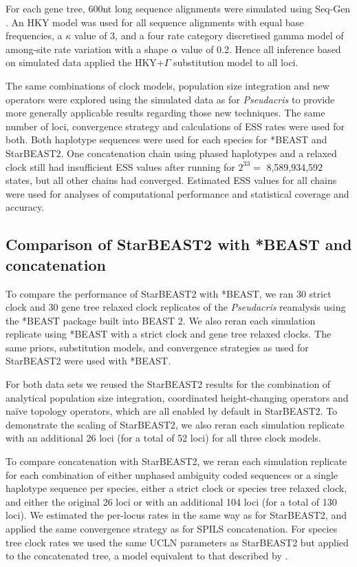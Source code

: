 \documentclass[12pt]{article}
\begin{document}
For each gene tree, 600nt long sequence alignments were simulated using Seq-Gen \citep{Rambaut01061997}. An HKY model was used for all sequence alignments
with equal base frequencies, a $\kappa$ value of 3, and a four rate category
discretised gamma model of among-site rate variation with a shape $\alpha$
value of 0.2. Hence all inference based on simulated data applied the HKY+$\Gamma$
substitution model to all loci.

The same combinations of clock models, population size integration and new
operators were explored using the simulated data as for \textit{Pseudacris} to
provide more generally applicable results regarding those new techniques. The
same number of loci, convergence strategy and calculations of ESS rates were
used for both. Both haplotype sequences were used for each species for *BEAST
and StarBEAST2. One concatenation chain using phased haplotypes and a relaxed
clock still had insufficient ESS values after running for $2^{33} =$
8,589,934,592 states, but all other chains had converged. Estimated ESS
values for all chains were used for analyses of computational performance and
statistical coverage and accuracy.

\subsection{Comparison of StarBEAST2 with *BEAST and concatenation}

To compare the performance of StarBEAST2 with *BEAST, we ran 30 strict clock
and 30 gene tree relaxed clock replicates of the \textit{Pseudacris}
reanalysis using the *BEAST package built into BEAST 2. We also reran each
simulation replicate using *BEAST with a strict clock and gene tree relaxed
clocks. The same priors, substitution models, and convergence strategies as
used for StarBEAST2 were used with *BEAST.

For both data sets we reused the StarBEAST2 results for the combination of
analytical population size integration, coordinated height-changing operators
and na\"ive topology operators, which are all enabled by default in
StarBEAST2. To demonstrate the scaling of StarBEAST2, we also reran each
simulation replicate with an additional 26 loci (for a total of 52 loci) for
all three clock models.

To compare concatenation with StarBEAST2, we reran each simulation replicate
for each combination of either unphased ambiguity coded sequences or a single
haplotype sequence per species, either a strict clock or species tree relaxed
clock, and either the original 26 loci or with an additional 104 loci (for a
total of 130 loci). We estimated the per-locus rates in the same way as for
StarBEAST2, and applied the same convergence strategy as for SPILS
concatenation. For species tree clock rates we used the same UCLN parameters
as StarBEAST2 but applied to the concatenated tree, a model equivalent to that
described by \cite{Rasmussen01122007}.
\end{document}
